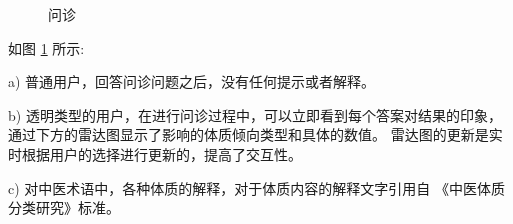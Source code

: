 \begin{figure}
    \caption{问诊}
    \label{fig:questions}
\end{figure}

如图 \ref{fig:questions} 所示:

a) 普通用户，回答问诊问题之后，没有任何提示或者解释。

b) 透明类型的用户，在进行问诊过程中，可以立即看到每个答案对结果的印象，通过下方的雷达图显示了影响的体质倾向类型和具体的数值。
雷达图的更新是实时根据用户的选择进行更新的，提高了交互性。

c) 对中医术语中，各种体质的解释，对于体质内容的解释文字引用自 《中医体质分类研究》标准。



